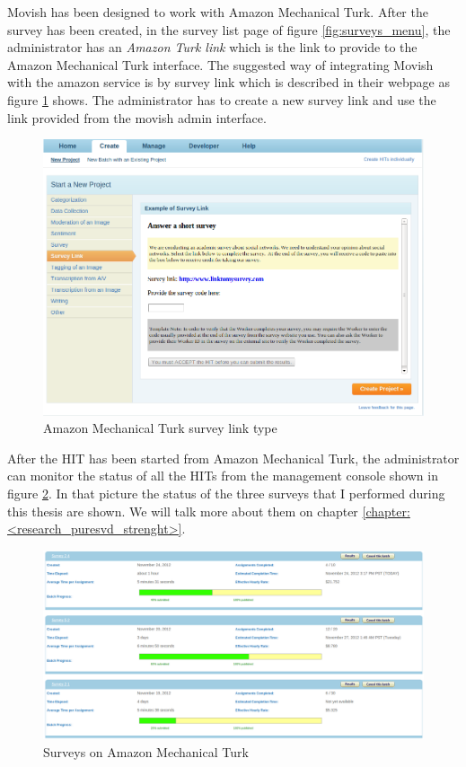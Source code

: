 Movish has been designed to work with Amazon Mechanical Turk. After the survey has been created, in the survey list page of figure \ref{fig:surveys_menu}, the administrator has an \textit{Amazon Turk link} which is the link to provide to the Amazon Mechanical Turk interface. The suggested way of integrating Movish with the amazon service is by survey link which is described in their webpage as figure \ref{fig:amazon_turk_survey_link} shows. The administrator has to create a new survey link and use the link provided from the movish admin interface.

\begin{figure}
  \centering
  \includegraphics[width=\textwidth]{figures/amazon_turk_survey_link.png}
  \caption{Amazon Mechanical Turk survey link type}
  \label{fig:amazon_turk_survey_link}
\end{figure}

After the HIT has been started from Amazon Mechanical Turk, the administrator can monitor the status of all the HITs from the management console shown in figure \ref{fig:surveys_on_turk}. In that picture the status of the three surveys that I performed during this thesis are shown. We will talk more about them on chapter \ref{chapter:<research_puresvd_strenght>}.
 
\begin{figure}
  \centering
  \includegraphics[width=\textwidth]{figures/amazon_turk_surveys.png}
  \caption{Surveys on Amazon Mechanical Turk}
  \label{fig:surveys_on_turk}
\end{figure}

